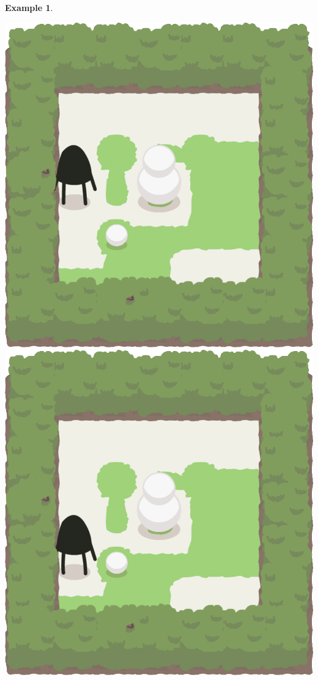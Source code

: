 \documentclass{report}
\theoremstyle{plain}
\newtheorem{example}{Example}[section]
\begin{document}
\begin{example}
\begin{center}
\includegraphics[width=\andyWidth\textwidth]{andy-basic-15.png} \quad
\includegraphics[width=\andyWidth\textwidth]{andy-basic-16.png}

\end{center}
\end{example}
\end{document}
